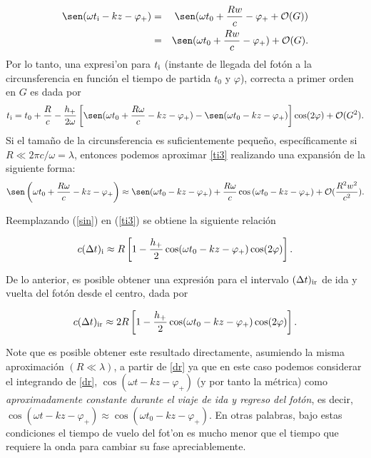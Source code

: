 \begin{eqnarray}
\sen(\omega t_{\rm i}-kz-\varphi_+)&=&\sen(\omega t_0+\frac{Rw}{c}-\varphi_++\mathcal{O}(G))\\
&= &\sen(\omega t_0+\frac{Rw}{c}-\varphi_+)+\mathcal{O}(G) .
\end{eqnarray}
Por lo tanto, una expresi'on para $t_{\rm i}$ (instante de llegada del fot\'on a la circunsferencia en funci\'on el tiempo de partida $t_0$ y $\varphi$), correcta a primer orden en $G$ es dada por
\begin{equation}
t_{\rm i}=t_0+\frac{R}{c}-\frac{h_+}{2\omega}\left[\sen(\omega t_0+\frac{R\omega}{c}-kz-\varphi_+)-\sen(\omega t_0-kz-\varphi_+)\right]\cos(2\varphi)+\mathcal{O}(G^2). \label{ti3}
\end{equation}
Si el tama\~no de la circunsferencia es suficientemente peque\~no, espec\'ificamente si $R\ll 2\pi c/\omega=\lambda$, entonces podemos aproximar \eqref{ti3} realizando una expansi\'on de la siguiente forma:
\begin{equation}
\sen\left(\omega t_0+\frac{R\omega}{c}-kz-\varphi_+\right)\approx \sen(\omega t_0-kz-\varphi_+)+\frac{R\omega}{c}\cos\left(\omega t_0-kz-\varphi_+ \right)+\mathcal{O}(\frac{R^2 w^2}{c^2}) .\label{sin}
\end{equation}

Reemplazando (\ref{sin}) en (\ref{ti3}) se obtiene la siguiente relaci\'on

\begin{equation}
c(\Delta t)_{\rm i}\approx R\left[1-\frac{h_+}{2}\cos(\omega t_0-kz-\varphi_+)\cos(2\varphi) \right].
\end{equation}

De lo anterior, es posible obtener una expresi\'on para el intervalo $(\Delta t)_{\rm ir}$ de ida y vuelta del fot\'on desde el centro, dada por

\begin{equation}
c(\Delta t)_{\rm ir}\approx 2R\left[1-\frac{h_+}{2}\cos(\omega t_0-kz-\varphi_+)\cos(2\varphi) \right]. \label{tir}
\end{equation}

Note que es posible obtener este resultado directamente, asumiendo la misma aproximaci\'on $(R\ll \lambda)$, a partir de \eqref{dr} ya que en este caso podemos considerar el integrando de \eqref{dr}, $\cos(\omega t-kz-\varphi_+)$ (y por tanto la m\'etrica) como \textit{aproximadamente constante durante el viaje de ida y regreso del fot\'on}, es decir, $\cos(\omega t-kz-\varphi_+)\approx \cos(\omega t_0-kz-\varphi_+)$. En otras palabras, bajo estas condiciones el tiempo de vuelo del fot'on es mucho menor que el tiempo que requiere la onda para cambiar su fase apreciablemente.

